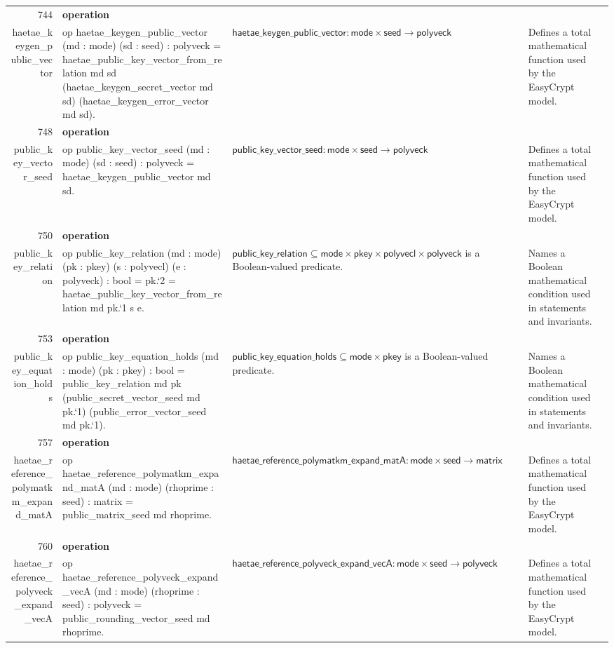 \documentclass[10pt]{article}
\newcommand{\ec}[1]{\begingroup\ttfamily\scriptsize #1\endgroup}
\begin{document}
\begin{longtable}{r L{0.17\textwidth} L{0.26\textwidth} L{0.27\textwidth} L{0.20\textwidth}}
744 & \textbf{operation}\\\ec{haetae\_keygen\_public\_vector} & \ec{op haetae\_keygen\_public\_vector (md : mode) (sd : seed) : polyveck = haetae\_public\_key\_vector\_from\_relation md sd (haetae\_keygen\_secret\_vector md sd) (haetae\_keygen\_error\_vector md sd).} & \(\mathsf{haetae\_keygen\_public\_vector} : \mathsf{mode} \times \mathsf{seed} \to \mathsf{polyveck}\) & Defines a total mathematical function used by the EasyCrypt model. \\
748 & \textbf{operation}\\\ec{public\_key\_vector\_seed} & \ec{op public\_key\_vector\_seed (md : mode) (sd : seed) : polyveck = haetae\_keygen\_public\_vector md sd.} & \(\mathsf{public\_key\_vector\_seed} : \mathsf{mode} \times \mathsf{seed} \to \mathsf{polyveck}\) & Defines a total mathematical function used by the EasyCrypt model. \\
750 & \textbf{operation}\\\ec{public\_key\_relation} & \ec{op public\_key\_relation (md : mode) (pk : pkey) (s : polyvecl) (e : polyveck) : bool = pk.`2 = haetae\_public\_key\_vector\_from\_relation md pk.`1 s e.} & \(\mathsf{public\_key\_relation} \subseteq \mathsf{mode} \times \mathsf{pkey} \times \mathsf{polyvecl} \times \mathsf{polyveck}\) is a Boolean-valued predicate. & Names a Boolean mathematical condition used in statements and invariants. \\
753 & \textbf{operation}\\\ec{public\_key\_equation\_holds} & \ec{op public\_key\_equation\_holds (md : mode) (pk : pkey) : bool = public\_key\_relation md pk (public\_secret\_vector\_seed md pk.`1) (public\_error\_vector\_seed md pk.`1).} & \(\mathsf{public\_key\_equation\_holds} \subseteq \mathsf{mode} \times \mathsf{pkey}\) is a Boolean-valued predicate. & Names a Boolean mathematical condition used in statements and invariants. \\
757 & \textbf{operation}\\\ec{haetae\_reference\_polymatkm\_expand\_matA} & \ec{op haetae\_reference\_polymatkm\_expand\_matA (md : mode) (rhoprime : seed) : matrix = public\_matrix\_seed md rhoprime.} & \(\mathsf{haetae\_reference\_polymatkm\_expand\_matA} : \mathsf{mode} \times \mathsf{seed} \to \mathsf{matrix}\) & Defines a total mathematical function used by the EasyCrypt model. \\
760 & \textbf{operation}\\\ec{haetae\_reference\_polyveck\_expand\_vecA} & \ec{op haetae\_reference\_polyveck\_expand\_vecA (md : mode) (rhoprime : seed) : polyveck = public\_rounding\_vector\_seed md rhoprime.} & \(\mathsf{haetae\_reference\_polyveck\_expand\_vecA} : \mathsf{mode} \times \mathsf{seed} \to \mathsf{polyveck}\) & Defines a total mathematical function used by the EasyCrypt model. \\

\end{longtable}
\end{document}

